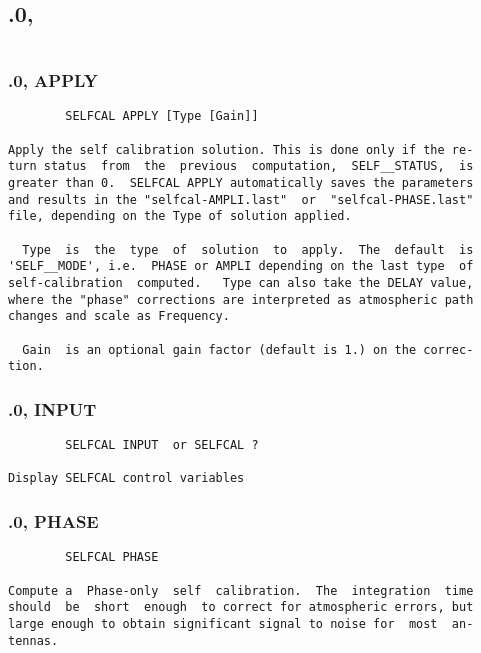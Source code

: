 \subsection{.0,}
\begin{verbatim}

\end{verbatim}
\subsubsection{.0, APPLY}
\begin{verbatim}
        SELFCAL APPLY [Type [Gain]]

Apply the self calibration solution. This is done only if the re-
turn status  from  the  previous  computation,  SELF__STATUS,  is
greater than 0.  SELFCAL APPLY automatically saves the parameters
and results in the "selfcal-AMPLI.last"  or  "selfcal-PHASE.last"
file, depending on the Type of solution applied.

  Type  is  the  type  of  solution  to  apply.  The  default  is
'SELF__MODE', i.e.  PHASE or AMPLI depending on the last type  of
self-calibration  computed.   Type can also take the DELAY value,
where the "phase" corrections are interpreted as atmospheric path
changes and scale as Frequency.

  Gain  is an optional gain factor (default is 1.) on the correc-
tion.

\end{verbatim}
\subsubsection{.0, INPUT}
\begin{verbatim}
        SELFCAL INPUT  or SELFCAL ?

Display SELFCAL control variables

\end{verbatim}
\subsubsection{.0, PHASE}
\begin{verbatim}
        SELFCAL PHASE

Compute a  Phase-only  self  calibration.  The  integration  time
should  be  short  enough  to correct for atmospheric errors, but
large enough to obtain significant signal to noise for  most  an-
tennas.

\end{verbatim}
